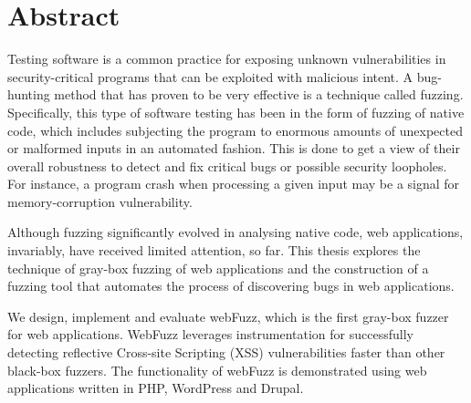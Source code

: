 \section*{\LARGE{Abstract}}

Testing software is a common practice for exposing unknown vulnerabilities
in security-critical programs that can be exploited with malicious intent.
A bug-hunting method that has proven to be very effective is a technique
called fuzzing. Specifically, this type of software testing has been in the
form of fuzzing of native code, which includes subjecting the program to
enormous amounts of unexpected or malformed inputs in an automated fashion.
This is done to get a view of their overall robustness to detect and fix
critical bugs or possible security loopholes. For instance, a program crash
when processing a given input may be a signal for memory-corruption
vulnerability.

Although fuzzing significantly evolved in analysing native code, web
applications, invariably, have received limited attention, so far. This thesis
explores the technique of gray-box fuzzing of web applications and the
construction of a fuzzing tool that automates the process of discovering
bugs in web applications.

We design, implement and evaluate webFuzz, which is the first gray-box
fuzzer for web applications. WebFuzz leverages instrumentation for successfully
detecting reflective Cross-site Scripting (XSS) vulnerabilities faster than other
black-box fuzzers. The functionality of webFuzz is demonstrated using web applications written in PHP, WordPress and Drupal.